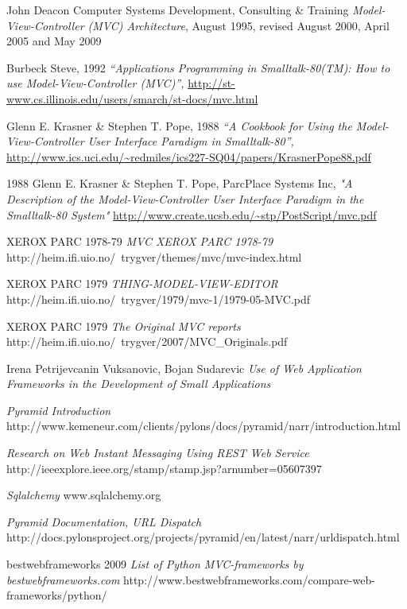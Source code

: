 \documentclass[finnish,utf8,nonumbib,palatino,kandi]{gradu2}
\begin{document}
\begin{thebibliography}{9} %
    John Deacon Computer Systems Development, Consulting \& Training
    \emph{Model-View-Controller (MVC) Architecture},
    August 1995, revised August 2000, April 2005 and May 2009

   Burbeck Steve, 1992
  \emph{“Applications Programming in Smalltalk-80(TM): How to use Model-View-Controller (MVC)”,}
  \url{http://st-www.cs.illinois.edu/users/smarch/st-docs/mvc.html}
 
   Glenn E. Krasner \& Stephen T. Pope, 1988
  \emph{“A Cookbook for Using the Model-View-Controller User Interface Paradigm in Smalltalk-80”,}
  \url{http://www.ics.uci.edu/~redmiles/ics227-SQ04/papers/KrasnerPope88.pdf}

 1988 Glenn E. Krasner \& Stephen T. Pope, ParcPlace Systems Inc,
	\emph{"A Description of the Model-View-Controller User Interface Paradigm in the Smalltalk-80 System"}
	\url{http://www.create.ucsb.edu/~stp/PostScript/mvc.pdf}

  XEROX PARC 1978-79
  \emph{MVC XEROX PARC 1978-79}
http://heim.ifi.uio.no/~trygver/themes/mvc/mvc-index.html

  XEROX PARC 1979
  \emph{THING-MODEL-VIEW-EDITOR}
   http://heim.ifi.uio.no/~trygver/1979/mvc-1/1979-05-MVC.pdf

  XEROX PARC 1979
  \emph{The Original MVC reports}
 http://heim.ifi.uio.no/~trygver/2007/MVC\_Originals.pdf

Irena Petrijevcanin Vuksanovic, Bojan Sudarevic
  \emph{Use of Web Application Frameworks in the Development of Small Applications}


  \emph{Pyramid Introduction}
   http://www.kemeneur.com/clients/pylons/docs/pyramid/narr/introduction.html

\emph{Research on Web Instant Messaging Using REST Web Service}
http://ieeexplore.ieee.org/stamp/stamp.jsp?arnumber=05607397

\emph{Sqlalchemy}
www.sqlalchemy.org

\emph{Pyramid Documentation, URL Dispatch}
http://docs.pylonsproject.org/projects/pyramid/en/latest/narr/urldispatch.html

bestwebframeworks 2009
\emph{List of Python MVC-frameworks by bestwebframeworks.com}
http://www.bestwebframeworks.com/compare-web-frameworks/python/

\end{thebibliography}
\end{document}
